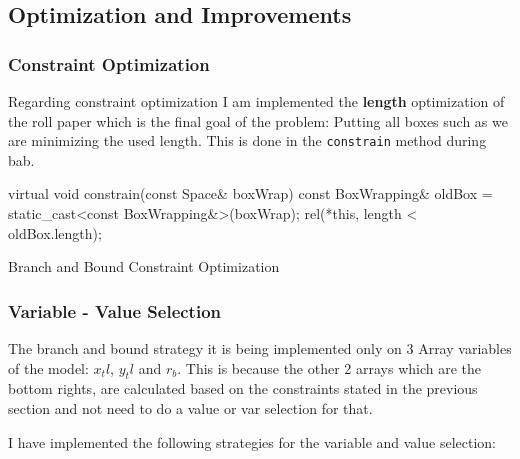 \documentclass[12pt, a4paper]{article}
\begin{document}
\subsection{Optimization and Improvements}
\subsubsection{Constraint Optimization}
Regarding constraint optimization I am implemented the \textbf{length} optimization of the roll paper which is the final goal of the problem: Putting all boxes such as we are minimizing the used length. This is done in the \texttt{constrain} method during \acrfull{bab}.

\begin{listing}[H]
\begin{cppcode*}{}
  virtual void constrain(const Space& boxWrap) {
    const BoxWrapping& oldBox = static_cast<const BoxWrapping&>(boxWrap);
    rel(*this, length < oldBox.length);
  }
\end{cppcode*}
\caption{Branch and Bound Constraint Optimization}
\label{lst:constrain}
\end{listing}



\subsubsection{Variable - Value Selection}
The branch and bound strategy it is being implemented only on 3 Array variables of the model: $x_tl$, $y_tl$ and $r_b$. This is because the other 2 arrays which are the bottom rights, are calculated based on the constraints stated in the previous section and not need to do a value or var selection for that.

I have implemented the following strategies for the variable and value selection:
\end{document}
